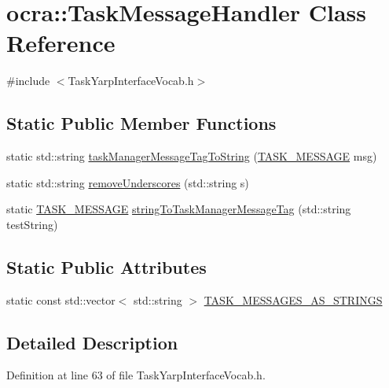 \hypertarget{classocra_1_1TaskMessageHandler}{}\section{ocra\+:\+:Task\+Message\+Handler Class Reference}
\label{classocra_1_1TaskMessageHandler}


{\ttfamily \#include $<$Task\+Yarp\+Interface\+Vocab.\+h$>$}

\subsection*{Static Public Member Functions}
\begin{DoxyCompactItemize}
\item 
static std\+::string \hyperlink{classocra_1_1TaskMessageHandler_a2a0c5990fe24d82e0c58b6133857a4cd}{task\+Manager\+Message\+Tag\+To\+String} (\hyperlink{namespaceocra_ae51761f3980546f5ee4cbc6ebe4216dd}{T\+A\+S\+K\+\_\+\+M\+E\+S\+S\+A\+GE} msg)
\item 
static std\+::string \hyperlink{classocra_1_1TaskMessageHandler_a688cdf189678986d158a1bc72ed84d2c}{remove\+Underscores} (std\+::string s)
\item 
static \hyperlink{namespaceocra_ae51761f3980546f5ee4cbc6ebe4216dd}{T\+A\+S\+K\+\_\+\+M\+E\+S\+S\+A\+GE} \hyperlink{classocra_1_1TaskMessageHandler_a3f7195e7ad813c5da3ed175fd4e019a7}{string\+To\+Task\+Manager\+Message\+Tag} (std\+::string test\+String)
\end{DoxyCompactItemize}
\subsection*{Static Public Attributes}
\begin{DoxyCompactItemize}
\item 
static const std\+::vector$<$ std\+::string $>$ \hyperlink{classocra_1_1TaskMessageHandler_a9afe80001080bc12286069365ab918ee}{T\+A\+S\+K\+\_\+\+M\+E\+S\+S\+A\+G\+E\+S\+\_\+\+A\+S\+\_\+\+S\+T\+R\+I\+N\+GS}
\end{DoxyCompactItemize}


\subsection{Detailed Description}


Definition at line 63 of file Task\+Yarp\+Interface\+Vocab.\+h.



